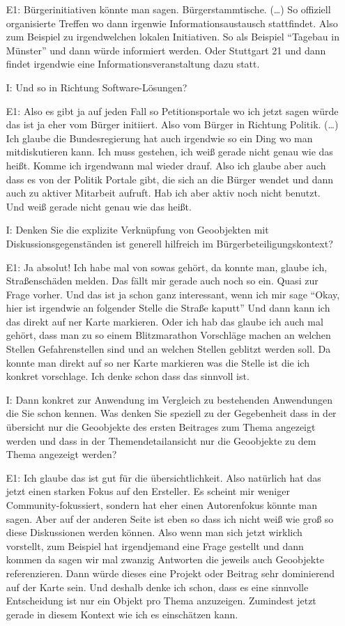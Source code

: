 \begin{itemize}
    \item[E1:] B{\"u}rgerinitiativen k{\"o}nnte man sagen. B{\"u}rgerstammtische. (\dots) So offiziell organisierte Treffen wo dann irgenwie Informationsaustausch stattfindet. Also zum Beispiel zu irgendwelchen lokalen Initiativen. So als Beispiel "`Tagebau in M{\"u}nster"' und dann w{\"u}rde informiert werden. Oder Stuttgart 21 und dann findet irgendwie eine Informationsveranstaltung dazu statt. 
    \item[I:] Und so in Richtung Software-L{\"o}sungen?
    \item[E1:] Also es gibt ja auf jeden Fall so Petitionsportale wo ich jetzt sagen w{\"u}rde das ist ja eher vom B{\"u}rger initiiert. Also vom B{\"u}rger in Richtung Politik. (\dots) Ich glaube die Bundesregierung hat auch irgendwie so ein Ding wo man mitdiskutieren kann. Ich muss gestehen, ich wei{\ss} gerade nicht genau wie das hei{\ss}t. Komme ich irgendwann mal wieder drauf. Also ich glaube aber auch dass es von der Politik Portale gibt, die sich an die B{\"u}rger wendet und dann auch zu aktiver Mitarbeit aufruft. Hab ich aber aktiv noch nicht benutzt. Und wei{\ss} gerade nicht genau wie das hei{\ss}t. 
    \item[I:] Denken Sie die explizite Verkn{\"u}pfung von Geoobjekten mit Diskussionsgegenst{\"a}nden ist generell hilfreich im B{\"u}rgerbeteiligungskontext?
    \item[E1:] Ja absolut! Ich habe mal von sowas geh{\"o}rt, da konnte man, glaube ich, Stra{\ss}ensch{\"a}den melden. Das f{\"a}llt mir gerade auch noch so ein. Quasi zur Frage vorher. Und das ist ja schon ganz interessant, wenn ich mir sage "`Okay, hier ist irgendwie an folgender Stelle die Stra{\ss}e kaputt"' Und dann kann ich das direkt auf ner Karte markieren. Oder ich hab das glaube ich auch mal geh{\"o}rt, dass man zu so einem Blitzmarathon Vorschl{\"a}ge machen an welchen Stellen Gefahrenstellen sind und an welchen Stellen geblitzt werden soll. Da konnte man direkt auf so ner Karte markieren was die Stelle ist die ich konkret vorschlage. Ich denke schon dass das sinnvoll ist. 
    \item[I:] Dann konkret zur Anwendung im Vergleich zu bestehenden Anwendungen die Sie schon kennen. Was denken Sie speziell zu der Gegebenheit dass in der {\"u}bersicht nur die Geoobjekte des ersten Beitrages zum Thema angezeigt werden und dass in der Themendetailansicht nur die Geoobjekte zu dem Thema angezeigt werden?
    \item[E1:] Ich glaube das ist gut f{\"u}r die {\"u}bersichtlichkeit. Also nat{\"u}rlich hat das jetzt einen starken Fokus auf den Ersteller. Es scheint mir weniger Community-fokussiert, sondern hat eher einen Autorenfokus k{\"o}nnte man sagen. Aber auf der anderen Seite ist eben so dass ich nicht wei{\ss} wie gro{\ss} so diese Diskussionen werden k{\"o}nnen. Also wenn man sich jetzt wirklich vorstellt, zum Beispiel hat irgendjemand eine Frage gestellt und dann kommen da sagen wir mal zwanzig Antworten die jeweils auch Geoobjekte referenzieren. Dann w{\"u}rde dieses eine Projekt oder Beitrag sehr dominierend auf der Karte sein. Und deshalb denke ich schon, dass es eine sinnvolle Entscheidung ist nur ein Objekt pro Thema anzuzeigen. Zumindest jetzt gerade in diesem Kontext wie ich es einsch{\"a}tzen kann.

\end{itemize}
